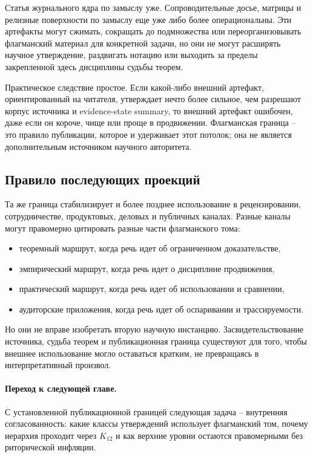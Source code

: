 Статья журнального ядра по замыслу уже. Сопроводительные досье, матрицы и
релизные поверхности по замыслу еще уже либо более операциональны. Эти
артефакты могут сжимать, сокращать до подмножества или переорганизовывать
флагманский материал для конкретной задачи, но они не могут расширять научное
утверждение, раздвигать нотацию или выходить за пределы закрепленной здесь
дисциплины судьбы теорем.

Практическое следствие простое. Если какой-либо внешний артефакт,
ориентированный на читателя, утверждает нечто более сильное, чем разрешают
корпус источника и evidence-state summary, то внешний артефакт ошибочен, даже если он короче,
чище или проще в продвижении. Флагманская граница -- это правило публикации,
которое и удерживает этот потолок; она не является дополнительным источником
научного авторитета.

\subsection{Правило последующих проекций}

Та же граница стабилизирует и более позднее использование в рецензировании,
сотрудничестве, продуктовых, деловых и публичных каналах. Разные каналы могут
правомерно цитировать разные части флагманского тома:

\begin{itemize}
\item теоремный маршрут, когда речь идет об ограниченном доказательстве,
\item эмпирический маршрут, когда речь идет о дисциплине продвижения,
\item практический маршрут, когда речь идет об использовании и сравнении,
\item аудиторские приложения, когда речь идет об оспаривании и
      трассируемости.
\end{itemize}

Но они не вправе изобретать вторую научную инстанцию. Засвидетельствование
источника, судьба теорем и публикационная граница существуют для того, чтобы
внешнее использование могло оставаться кратким, не превращаясь в
интерпретативный произвол.

\paragraph{Переход к следующей главе.}
С установленной публикационной границей следующая задача -- внутренняя
согласованность: какие классы утверждений использует флагманский том, почему
иерархия проходит через \(K_{12}\) и как верхние уровни остаются правомерными
без риторической инфляции.

\clearpage
